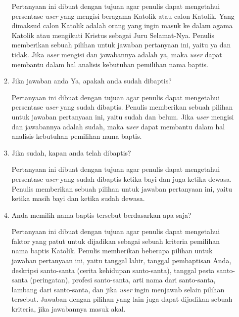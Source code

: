 \documentclass[a4paper,twoside]{article}
\begin{document}
\begin{enumerate}
\begin{enumerate}
	Pertanyaan ini dibuat dengan tujuan agar penulis dapat mengetahui persentase \textit{user} yang mengisi beragama Katolik atau calon Katolik. Yang dimaksud calon Katolik adalah orang yang ingin masuk ke dalam agama Katolik atau mengikuti Kristus sebagai Juru Selamat-Nya. Penulis memberikan sebuah pilihan untuk jawaban pertanyaan ini, yaitu ya dan tidak. Jika \textit{user} mengisi dan jawabannya adalah ya, maka \textit{user} dapat membantu dalam hal analisis kebutuhan pemilihan nama baptis. %
	\item Jika jawaban anda Ya, apakah anda sudah dibaptis?
	
	Pertanyaan ini dibuat dengan tujuan agar penulis dapat mengetahui persentase \textit{user} yang sudah dibaptis. Penulis memberikan sebuah pilihan untuk jawaban pertanyaan ini, yaitu sudah dan belum. Jika \textit{user} mengisi dan jawabannya adalah sudah, maka \textit{user} dapat membantu dalam hal analisis kebutuhan pemilihan nama baptis. %
	\item Jika sudah, kapan anda telah dibaptis?
	
	Pertanyaan ini dibuat dengan tujuan agar penulis dapat mengetahui persentase \textit{user} yang sudah dibaptis ketika bayi dan juga ketika dewasa. Penulis memberikan sebuah pilihan untuk jawaban pertanyaan ini, yaitu ketika masih bayi dan ketika sudah dewasa.
	
	\item Anda memilih nama baptis tersebut berdasarkan apa saja?
	
	Pertanyaan ini dibuat dengan tujuan agar penulis dapat mengetahui faktor yang patut untuk dijadikan sebagai sebuah kriteria pemilihan nama baptis Katolik. Penulis memberikan beberapa pilihan untuk jawaban pertanyaan ini, yaitu tanggal lahir, tanggal pembaptisan Anda, deskripsi santo-santa (cerita kehidupan santo-santa), tanggal pesta santo-santa (peringatan), profesi santo-santa, arti nama dari santo-santa, lambang dari santo-santa, dan jika \textit{user} ingin menjawab selain pilihan tersebut. Jawaban dengan pilihan yang lain juga dapat dijadikan sebuah kriteria, jika jawabannya masuk akal.
\end{enumerate}


\end{enumerate}
\end{document}
